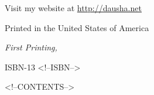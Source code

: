 \documentclass[11pt,twoside,makeidx]{memoir}
\begin{document}
  \par\noindent \theauthor
  \par\noindent Visit my website at \url{http://dausha.net}\newline

  \par\noindent Printed in the United States of America
  \newline

  \par\noindent\textit{First Printing, \usmonthyear{}}
  \newline
  
  \par\noindent ISBN-13 <!--ISBN-->
  \vspace*{\fill}
  \newpage

%

\tableofcontents

\mainmatter
\pagestyle{ebook}
\sloppy
<!--CONTENTS-->
\end{document}
